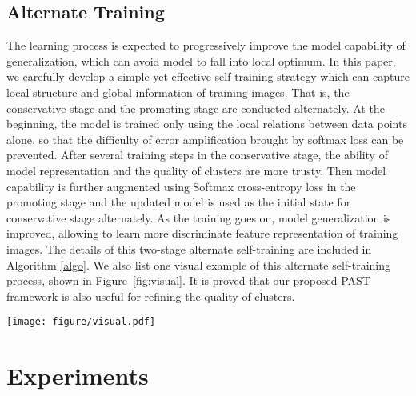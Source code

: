 \documentclass[10pt,twocolumn,letterpaper]{article}
\begin{document}
\subsection{Alternate  Training}
The learning process is expected to progressively improve the model capability of generalization, which can avoid model to fall into local optimum. In this paper, we carefully develop a simple yet effective self-training strategy which can capture local structure and global information of training images. 
That is, the conservative stage and the promoting stage are conducted alternately. 
At the beginning, the model is trained only using the local relations between data points alone, so that the difficulty of error amplification brought by softmax loss can be prevented. 
After several training steps in the conservative stage, the ability of model representation and the quality of clusters are more trusty. 
Then model capability is further augmented using Softmax cross-entropy loss in the promoting stage and the updated model is used as the initial state for conservative stage alternately. 
As the training goes on, model generalization is improved, allowing to learn more discriminate feature representation of training images. 
The details of this two-stage alternate self-training are included in Algorithm \ref{algo}. 
We also list one visual example of this alternate self-training process, shown in Figure~\ref{fig:visual}. 
It is proved that our proposed PAST framework is also useful for refining the quality of clusters.

\begin{figure*}[t]
\centering
\texttt{[image: figure/visual.pdf]}
\setlength{\abovecaptionskip}{-0.00025cm} 
\setlength{\belowcaptionskip}{-0.00055cm}
\caption{The alternate self-training process of our PAST framework on one visual example. All images belong to same person in truth. Samples with same color denotes that they are assigned to same pseudo label generated by HDBSCAN clustering method. \textcolor[rgb]{0.55,0.55,0.55}{Gray} figure means the sample not belonging to any cluster and not being used for model training. From training iteration 1 to iteration 4, more samples are selected for training. At the same time, the pseudo labels are more reliable.}
\label{fig:visual}
\end{figure*}

\section{Experiments}\label{experiment}
\end{document}
